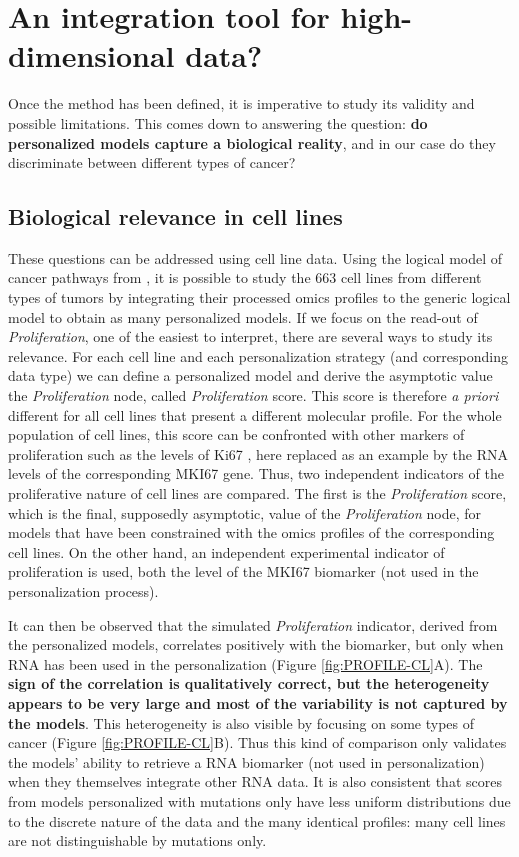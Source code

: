 \documentclass[a4paper,12pt,twoside,onecolumn,openright,final,oldfontcommands]{memoir}
\begin{document}
\section{An integration tool for high-dimensional
data?}\label{an-integration-tool-for-high-dimensional-data}

Once the method has been defined, it is imperative to study its validity
and possible limitations. This comes down to answering the question:
\textbf{do personalized models capture a biological reality}, and in our
case do they discriminate between different types of cancer?

\subsection{Biological relevance in cell lines}\label{PROFILE-CL}

These questions can be addressed using cell line data. Using the logical
model of cancer pathways from \citet{fumia2013boolean}, it is possible
to study the 663 cell lines from different types of tumors by
integrating their processed omics profiles to the generic logical model
to obtain as many personalized models. If we focus on the read-out of
\emph{Proliferation}, one of the easiest to interpret, there are several
ways to study its relevance. For each cell line and each personalization
strategy (and corresponding data type) we can define a personalized
model and derive the asymptotic value the \emph{Proliferation} node,
called \emph{Proliferation} score. This score is therefore \emph{a
priori} different for all cell lines that present a different molecular
profile. For the whole population of cell lines, this score can be
confronted with other markers of proliferation such as the levels of
Ki67 \citep{miller2018ki67}, here replaced as an example by the RNA
levels of the corresponding MKI67 gene. Thus, two independent indicators
of the proliferative nature of cell lines are compared. The first is the
\emph{Proliferation} score, which is the final, supposedly asymptotic,
value of the \emph{Proliferation} node, for models that have been
constrained with the omics profiles of the corresponding cell lines. On
the other hand, an independent experimental indicator of proliferation
is used, both the level of the MKI67 biomarker (not used in the
personalization process).

It can then be observed that the simulated \emph{Proliferation}
indicator, derived from the personalized models, correlates positively
with the biomarker, but only when RNA has been used in the
personalization (Figure \ref{fig:PROFILE-CL}A). The \textbf{sign of the
correlation is qualitatively correct, but the heterogeneity appears to
be very large and most of the variability is not captured by the
models}. This heterogeneity is also visible by focusing on some types of
cancer (Figure \ref{fig:PROFILE-CL}B). Thus this kind of comparison only
validates the models' ability to retrieve a RNA biomarker (not used in
personalization) when they themselves integrate other RNA data. It is
also consistent that scores from models personalized with mutations only
have less uniform distributions due to the discrete nature of the data
and the many identical profiles: many cell lines are not distinguishable
by mutations only.
\end{document}
